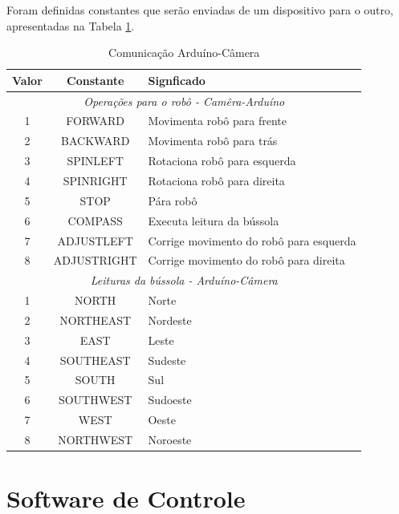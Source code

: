 Foram definidas constantes que serão enviadas de um dispositivo para o outro, apresentadas na Tabela \ref{int_tbl04}.

\begin{table}[htb!]
    \centering
    \begin{tabular}{|c|c|l|} \hline
        \textbf{Valor} & \textbf{Constante} & \textbf{Signficado} \\ \hline

        \multicolumn{3}{|c|}{\textit{Operações para o robô - Camêra-Arduíno}} \\ \hline
        1 & FORWARD & Movimenta robô para frente \\ \hline
        2 & BACKWARD & Movimenta robô para trás \\ \hline
        3 & SPINLEFT & Rotaciona robô para esquerda \\ \hline
        4 & SPINRIGHT & Rotaciona robô para direita \\ \hline
        5 & STOP & Pára robô \\ \hline
        6 & COMPASS & Executa leitura da bússola\\ \hline
        7 & ADJUSTLEFT & Corrige movimento do robô para esquerda \\ \hline
        8 & ADJUSTRIGHT & Corrige movimento do robô para direita \\ \hline
            
        \multicolumn{3}{|c|}{\textit{Leituras da bússola - Arduíno-Câmera}} \\ \hline
        1 & NORTH & Norte \\ \hline
        2 & NORTHEAST & Nordeste \\ \hline
        3 & EAST & Leste \\ \hline
        4 & SOUTHEAST & Sudeste \\ \hline
        5 & SOUTH & Sul \\ \hline
        6 & SOUTHWEST & Sudoeste \\ \hline
        7 & WEST & Oeste \\ \hline
        8 & NORTHWEST & Noroeste \\ \hline
    \end{tabular}
    \caption{Comunicação Arduíno-Câmera}
    \label{int_tbl04}

\end{table}


\section{Software de Controle}
\label{sec_soft_controle}

